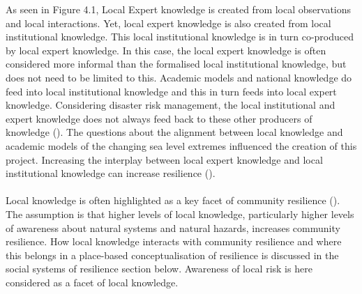 As seen in Figure 4.1, Local Expert knowledge is created from local observations and local interactions. Yet, local expert knowledge is also created from local institutional knowledge. This local institutional knowledge is in turn co-produced by local expert knowledge. In this case, the local expert knowledge is often considered more informal than the formalised local institutional knowledge, but does not need to be limited to this.  Academic models and national knowledge do feed into local institutional knowledge and this in turn feeds into local expert knowledge. Considering disaster risk management, the local institutional and expert knowledge does not always feed back to these other producers of knowledge (\cite{rod_integrated_2012}). The questions about the alignment between local knowledge and academic models of the changing sea level extremes influenced the creation of this project. Increasing the interplay between local expert knowledge and local institutional knowledge can increase resilience (\cite{setten_we_2019}).

\paragraph{}

Local knowledge is often highlighted as a key facet of community resilience (\cite{setten_we_2019}). The assumption is that higher levels of local knowledge, particularly higher levels of awareness about natural systems and natural hazards, increases community resilience.  How local knowledge interacts with community resilience and where this belongs in a place-based conceptualisation of resilience is discussed in the social systems of resilience section below. Awareness of local risk is here considered as a facet of local knowledge.  

 
 
